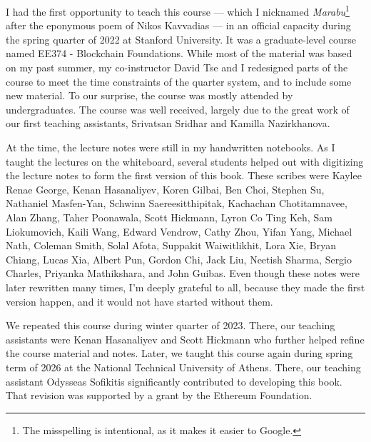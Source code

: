 %
I had the first opportunity to teach this course --- which I nicknamed
\emph{Marabu}\footnote{The misspelling is intentional, as it makes it easier to Google.}
after the eponymous poem of Nikos Kavvadias --- in an official capacity during the
spring quarter of 2022 at Stanford University. It was a graduate-level course
named EE374 - Blockchain Foundations. While most of the material was
based on my past summer, my co-instructor David Tse and I redesigned
parts of the course to meet the time constraints of the quarter system,
and to include some new material. To our surprise, the course was mostly
attended by undergraduates.
The course was well received,
largely due to the great work of our first teaching assistants,
Srivatsan Sridhar and Kamilla Nazirkhanova.

At the time, the lecture notes were still
in my handwritten notebooks. As I taught the lectures on the whiteboard,
several students helped out with digitizing the lecture notes to
form the first version of this book. These scribes were
Kaylee Renae George, Kenan Hasanaliyev, Koren Gilbai,
Ben Choi, Stephen Su, Nathaniel Masfen-Yan,
Schwinn Saereesitthipitak, Kachachan Chotitamnavee, Alan Zhang,
Taher Poonawala, Scott Hickmann,
Lyron Co Ting Keh, Sam Liokumovich,
Kaili Wang,
Edward Vendrow, Cathy Zhou,
Yifan Yang,
Michael Nath, Coleman Smith,
Solal Afota,
Suppakit Waiwitlikhit, Lora Xie,
Bryan Chiang, Lucas Xia,
Albert Pun, Gordon Chi,
Jack Liu,
Neetish Sharma, Sergio Charles,
Priyanka Mathikshara, and John Guibas.
Even though these notes were later rewritten many times,
I'm deeply grateful to all, because they made the first version happen,
and it would not have started without them.

We repeated this course during winter quarter of 2023.
There, our teaching assistants were Kenan Hasanaliyev
and Scott Hickmann who further helped refine the course material and notes.
Later, we taught this course again during spring term of 2026
at the National Technical University of Athens. There,
our teaching assistant Odysseas Sofikitis significantly contributed
to developing this book. That revision was supported by a grant
by the Ethereum Foundation.


